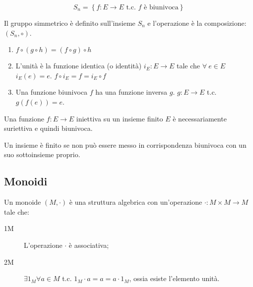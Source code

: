 \[
S_n = \left\{ f : E \to E \text{ t.c. $f$ \`e biunivoca} \right\}
\]

Il gruppo simmetrico \`e definito sull'insieme $S_n$ e l'operazione \`e la composizione: $\left( S_n, \circ \right)$.
\begin{enumerate}
    \item $f \circ \left( g \circ h \right) = \left( f \circ g \right) \circ h$ 
    \item L'unit\`a \`e la funzione identica (o identit\`a) $i_E : E \to E$ tale che $\forall \ e \in E $ $i_E(e) = e$. $f \circ i_E = f = i_E \circ f$ 
    \item Una funzione biunivoca $f$ ha una funzione inversa $g$. $g : E \to E $ t.c. $ g(f(e)) = e$.
\end{enumerate}

Una funzione $f : E \to E $ iniettiva su un insieme finito $E$ \`e necessariamente suriettiva e quindi biunivoca.

Un insieme \`e finito se non pu\`o essere messo in corrispondenza biunivoca con un suo sottoinsieme proprio.






\subsection{Monoidi}

Un monoide $(M, \cdot)$ \`e una struttura algebrica con un'operazione $\cdot : M \times M \to M$ tale che:
\begin{description}
    \item[1M] L'operazione $\cdot$ \`e associativa;
    \item[2M] $\exists 1_M \forall a \in M $ t.c. $1_M \cdot a = a = a \cdot 1_M$, ossia esiste l'elemento unit\`a. 
\end{description}

